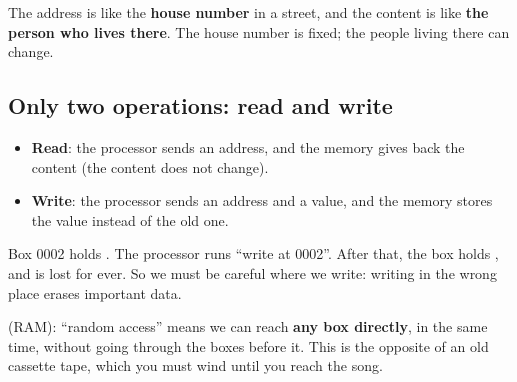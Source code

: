 \begin{center}
\end{center}

\begin{tashbih}
    The address is like the \textbf{house number} in a street, and the content is like \textbf{the person
    who lives there}. The house number is fixed; the people living there can change.
\end{tashbih}

\subsection{Only two operations: read and write}
\begin{itemize}
    \item \textbf{Read}: the processor sends an address, and the memory gives back the content (the content does not change).
    \item \textbf{Write}: the processor sends an address and a value, and the memory stores the value instead of the old one.
\end{itemize}

\begin{mithal}
    Box 0002 holds . The processor runs ``write  at 0002''. After that, the box holds
    , and  is lost for ever. So we must be careful where we write: writing in the wrong place
    erases important data.
\end{mithal}

\begin{tarif}
     (RAM): ``random access'' means we can reach
    \textbf{any box directly}, in the same time, without going through the boxes before it. This is the
    opposite of an old cassette tape, which you must wind until you reach the song.
\end{tarif}

